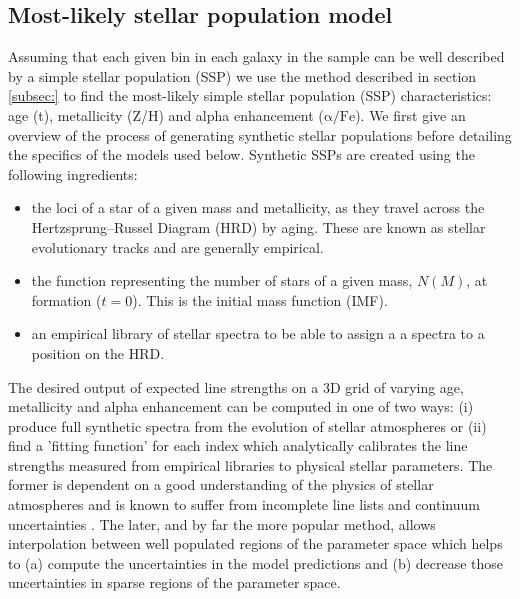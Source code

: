 	\subsection{Most-likely stellar population model}
		\label{subsec:ssp}
		Assuming that each given bin in each galaxy in the sample can be well described by a simple stellar population (SSP) we use the method described in section \ref{subsec:} to find the most-likely simple stellar population (SSP) characteristics: age (t), metallicity (Z/H) and alpha enhancement ($\mathrm{\alpha/Fe}$). We first give an overview of the process of generating synthetic stellar populations before detailing the specifics of the models used below. 
		Synthetic SSPs are created using the following ingredients:
		\begin{itemize}
			\item the loci of a star of a given mass and metallicity, as they travel across the Hertzsprung--Russel Diagram (HRD) by aging. These are known as stellar evolutionary tracks and are generally empirical.
			\item  the function representing the number of stars of a given mass, $N(M)$, at formation ($t = 0$). This is the initial mass function (IMF).
			\item an empirical library of stellar spectra to be able to assign a a spectra to a position on the HRD. 
		\end{itemize}
		The desired output of expected line strengths on a 3D grid of varying age, metallicity and alpha enhancement can be computed in one of two ways: (i) produce full synthetic spectra from the evolution of stellar atmospheres or (ii) find a 'fitting function' for each index which analytically calibrates the line strengths measured from empirical libraries to physical stellar parameters. The former is dependent on a good understanding of the physics of stellar atmospheres and is known to suffer from incomplete line lists and continuum uncertainties \citep{Thomas2004}. The later, and by far the more popular method, allows interpolation between well populated regions of the parameter space which helps to (a) compute the uncertainties in the model predictions and (b) decrease those uncertainties in sparse regions of the parameter space. 

